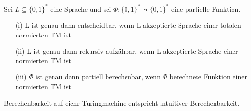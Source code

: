  Sei $L \subseteq \{0, 1\}^*$ eine Sprache und sei $\Phi : \{0, 1\}^* \leadsto \{0, 1\}^*$ eine partielle Funktion.
\begin{itemize}
  \item [(i)] L ist genau dann entscheidbar, wenn L akzeptierte Sprache einer totalen normierten TM ist. 
  \item [(ii)] L ist genau dann rekursiv aufzähbar, wenn L akzeptierte Sprache einer normierten TM ist.
  \item [(iii)] $\Phi$ ist genau dann partiell berechenbar, wenn $\Phi$ berechnete Funktion einer normierten TM ist.
\end{itemize}

 Berechenbarkeit auf eienr Turingmachine entspricht intuitiver Berechenbarkeit.
